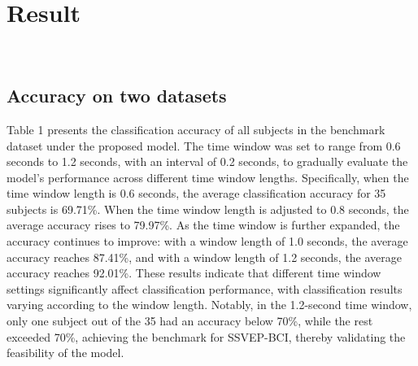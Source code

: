\documentclass[10pt]{iopart}
\begin{document}
\section{Result}
‌\subsection{Accuracy on two datasets}
Table 1 presents the classification accuracy of all subjects in the benchmark dataset under the proposed model. The time window was set to range from 0.6 seconds to 1.2 seconds, with an interval of 0.2 seconds, to gradually evaluate the model's performance across different time window lengths. Specifically, when the time window length is 0.6 seconds, the average classification accuracy for 35 subjects is 69.71\%. When the time window length is adjusted to 0.8 seconds, the average accuracy rises to 79.97\%. As the time window is further expanded, the accuracy continues to improve: with a window length of 1.0 seconds, the average accuracy reaches 87.41\%, and with a window length of 1.2 seconds, the average accuracy reaches 92.01\%. These results indicate that different time window settings significantly affect classification performance, with classification results varying according to the window length. Notably, in the 1.2-second time window, only one subject out of the 35 had an accuracy below 70\%, while the rest exceeded 70\%, achieving the benchmark for SSVEP-BCI, thereby validating the feasibility of the model. 
\end{document}
